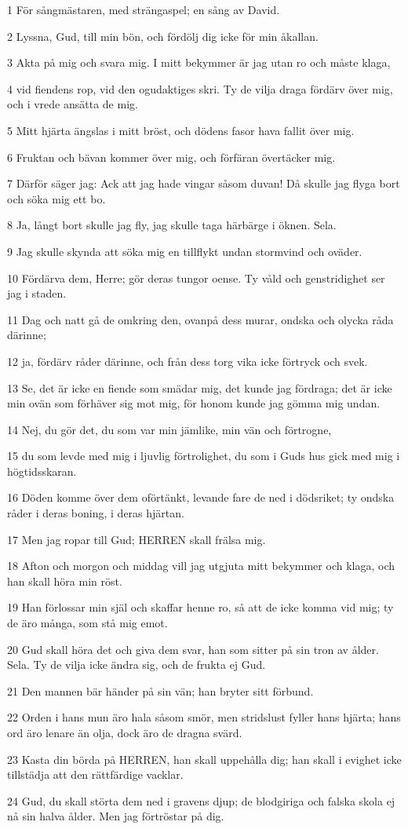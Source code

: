 \par 1 För sångmästaren, med strängaspel; en sång av David.
\par 2 Lyssna, Gud, till min bön, och fördölj dig icke för min åkallan.
\par 3 Akta på mig och svara mig. I mitt bekymmer är jag utan ro och måste klaga,
\par 4 vid fiendens rop, vid den ogudaktiges skri. Ty de vilja draga fördärv över mig, och i vrede ansätta de mig.
\par 5 Mitt hjärta ängslas i mitt bröst, och dödens fasor hava fallit över mig.
\par 6 Fruktan och bävan kommer över mig, och förfäran övertäcker mig.
\par 7 Därför säger jag: Ack att jag hade vingar såsom duvan! Då skulle jag flyga bort och söka mig ett bo.
\par 8 Ja, långt bort skulle jag fly, jag skulle taga härbärge i öknen. Sela.
\par 9 Jag skulle skynda att söka mig en tillflykt undan stormvind och oväder.
\par 10 Fördärva dem, Herre; gör deras tungor oense. Ty våld och genstridighet ser jag i staden.
\par 11 Dag och natt gå de omkring den, ovanpå dess murar, ondska och olycka råda därinne;
\par 12 ja, fördärv råder därinne, och från dess torg vika icke förtryck och svek.
\par 13 Se, det är icke en fiende som smädar mig, det kunde jag fördraga; det är icke min ovän som förhäver sig mot mig, för honom kunde jag gömma mig undan.
\par 14 Nej, du gör det, du som var min jämlike, min vän och förtrogne,
\par 15 du som levde med mig i ljuvlig förtrolighet, du som i Guds hus gick med mig i högtidsskaran.
\par 16 Döden komme över dem oförtänkt, levande fare de ned i dödsriket; ty ondska råder i deras boning, i deras hjärtan.
\par 17 Men jag ropar till Gud; HERREN skall frälsa mig.
\par 18 Afton och morgon och middag vill jag utgjuta mitt bekymmer och klaga, och han skall höra min röst.
\par 19 Han förlossar min själ och skaffar henne ro, så att de icke komma vid mig; ty de äro många, som stå mig emot.
\par 20 Gud skall höra det och giva dem svar, han som sitter på sin tron av ålder. Sela. Ty de vilja icke ändra sig, och de frukta ej Gud.
\par 21 Den mannen bär händer på sin vän; han bryter sitt förbund.
\par 22 Orden i hans mun äro hala såsom smör, men stridslust fyller hans hjärta; hans ord äro lenare än olja, dock äro de dragna svärd.
\par 23 Kasta din börda på HERREN, han skall uppehålla dig; han skall i evighet icke tillstädja att den rättfärdige vacklar.
\par 24 Gud, du skall störta dem ned i gravens djup; de blodgiriga och falska skola ej nå sin halva ålder. Men jag förtröstar på dig.


